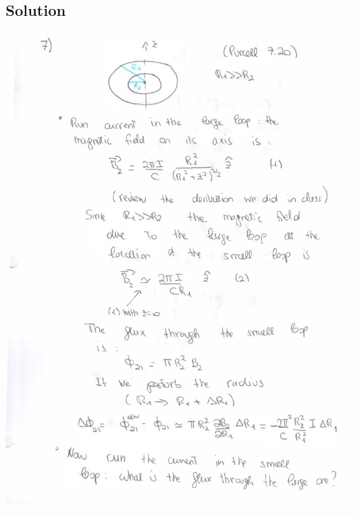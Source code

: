 \documentclass[solutions]{esg8022pset}
\begin{document}
\subsection{Solution}
  \begin{center}
    \includegraphics[width = \textwidth, height = 0.9\textheight, keepaspectratio = true]{ps9_7a}
    \clearpage

\end{center}
\end{document}
